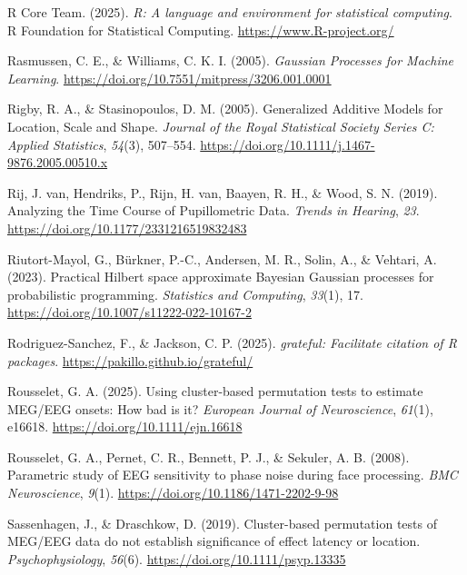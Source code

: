\documentclass[
  doc,
  floatsintext,
  longtable,
  a4paper,
  nolmodern,
  notxfonts,
  notimes,
  colorlinks=true,linkcolor=blue,citecolor=blue,urlcolor=blue]{apa7}
\newlength{\cslhangindent}
\newenvironment{CSLReferences}[2] %
 {\begin{list}{}{%
  \setlength{\itemindent}{0pt}
  \setlength{\leftmargin}{0pt}
  \setlength{\parsep}{0pt}
  \ifodd #1
   \setlength{\leftmargin}{\cslhangindent}
   \setlength{\itemindent}{-1\cslhangindent}
  \fi
  \setlength{\itemsep}{#2\baselineskip}}}
 {\end{list}}
\begin{document}
\begin{CSLReferences}{1}{0}
R Core Team. (2025). \emph{{R}: A language and environment for
statistical computing}. R Foundation for Statistical Computing.
\url{https://www.R-project.org/}

Rasmussen, C. E., \& Williams, C. K. I. (2005). \emph{Gaussian Processes
for Machine Learning}.
\url{https://doi.org/10.7551/mitpress/3206.001.0001}

Rigby, R. A., \& Stasinopoulos, D. M. (2005). Generalized Additive
Models for Location, Scale and Shape. \emph{Journal of the Royal
Statistical Society Series C: Applied Statistics}, \emph{54}(3),
507--554. \url{https://doi.org/10.1111/j.1467-9876.2005.00510.x}

Rij, J. van, Hendriks, P., Rijn, H. van, Baayen, R. H., \& Wood, S. N.
(2019). Analyzing the Time Course of Pupillometric Data. \emph{Trends in
Hearing}, \emph{23}. \url{https://doi.org/10.1177/2331216519832483}

Riutort-Mayol, G., Bürkner, P.-C., Andersen, M. R., Solin, A., \&
Vehtari, A. (2023). Practical {Hilbert} space approximate {Bayesian
Gaussian} processes for probabilistic programming. \emph{Statistics and
Computing}, \emph{33}(1), 17.
\url{https://doi.org/10.1007/s11222-022-10167-2}

Rodriguez-Sanchez, F., \& Jackson, C. P. (2025). \emph{{grateful}:
Facilitate citation of {R} packages}.
\url{https://pakillo.github.io/grateful/}

Rousselet, G. A. (2025). Using cluster-based permutation tests to
estimate {MEG}/{EEG} onsets: {How} bad is it? \emph{European Journal of
Neuroscience}, \emph{61}(1), e16618.
\url{https://doi.org/10.1111/ejn.16618}

Rousselet, G. A., Pernet, C. R., Bennett, P. J., \& Sekuler, A. B.
(2008). Parametric study of EEG sensitivity to phase noise during face
processing. \emph{BMC Neuroscience}, \emph{9}(1).
\url{https://doi.org/10.1186/1471-2202-9-98}

Sassenhagen, J., \& Draschkow, D. (2019). Cluster{-}based permutation
tests of MEG/EEG data do not establish significance of effect latency or
location. \emph{Psychophysiology}, \emph{56}(6).
\url{https://doi.org/10.1111/psyp.13335}


\end{CSLReferences}
\end{document}
